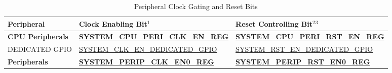 \documentclass[main\_\_EN.tex]{subfiles}
\begin{document}
\begin{longtable}[c]{ |p{4cm}|p{6cm}|p{6cm}| }
\caption{Peripheral Clock Gating and Reset Bits}
\label{table:peripheralcontrollingbit}
\\\hline\rowcolor{lightgray}
Peripheral    & Clock Enabling Bit{\hyperref[table:reset_notes]{$^1$}} & Reset Controlling Bit{\hyperref[table:reset_notes]{$^2$}}{\hyperref[table:reset_notes]{$^3$}}\\\hline
\textbf{CPU Peripherals} & \textbf{\hyperref[regdesc:SYSTEMCPUPERICLKENREG]{SYSTEM\_CPU\_PERI\_CLK\_EN\_REG}} & \textbf{\hyperref[regdesc:SYSTEMCPUPERIRSTENREG]{SYSTEM\_CPU\_PERI\_RST\_EN\_REG}} \\ \hline

DEDICATED GPIO & \hyperref[fielddesc:SYSTEMCLKENDEDICATEDGPIO]{SYSTEM\_CLK\_EN\_DEDICATED\_GPIO} & \hyperref[fielddesc:SYSTEMRSTENDEDICATEDGPIO]{SYSTEM\_RST\_EN\_DEDICATED\_GPIO} \\\hline

\textbf{Peripherals} & \textbf{\hyperref[regdesc:SYSTEMPERIPCLKEN0REG]{SYSTEM\_PERIP\_CLK\_EN0\_REG}} & \textbf{\hyperref[regdesc:SYSTEMPERIPRSTEN0REG]{SYSTEM\_PERIP\_RST\_EN0\_REG}} \\ \hline


\end{longtable}
\end{document}

